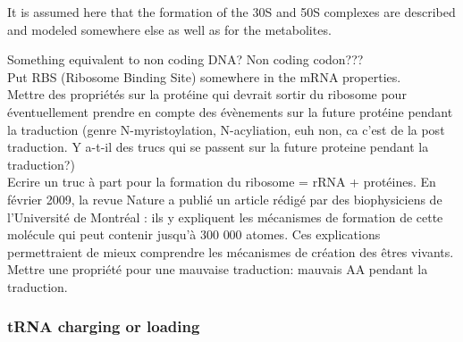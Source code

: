It is assumed here that the formation of the 30S and 50S complexes are described and modeled somewhere else as well as for the metabolites.

\textcolor[rgb]{1.00,0.00,0.00}{Something equivalent to non coding DNA? Non coding codon???} \\
\textcolor[rgb]{1.00,0.00,0.00}{Put RBS (Ribosome Binding Site) somewhere in the mRNA properties.} \\
\textcolor[rgb]{1.00,0.00,0.00}{Mettre des propriétés sur la protéine qui devrait sortir du ribosome pour éventuellement prendre en compte des évènements sur la future protéine pendant la traduction (genre N-myristoylation, N-acyliation, euh non, ca c'est de la post traduction. Y a-t-il des trucs qui se passent sur la future proteine pendant la traduction?)} \\
\textcolor[rgb]{1.00,0.00,0.00}{Ecrire un truc à part pour la formation du ribosome = rRNA + protéines. En février 2009, la revue Nature a publié un article rédigé par des biophysiciens de l'Université de Montréal : ils y expliquent les mécanismes de formation de cette molécule qui peut contenir jusqu'à 300 000 atomes. Ces explications permettraient de mieux comprendre les mécanismes de création des êtres vivants.} \\
\textcolor[rgb]{1.00,0.00,0.00}{Mettre une propriété pour une mauvaise traduction: mauvais AA pendant la traduction.} \\


\subsubsection{tRNA charging or loading}
